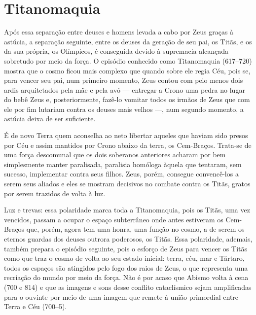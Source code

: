 \section{Titanomaquia}

Após essa separação entre deuses e homens levada a cabo por Zeus graças
à astúcia, a separação seguinte, entre os deuses da geração de seu pai,
os Titãs, e os da sua própria, os Olímpicos, é conseguida devido à
supremacia alcançada sobretudo por meio da força. O episódio conhecido
como Titanomaquia (617--720) mostra que o cosmo ficou mais complexo que
quando sobre ele regia Céu, pois se, para vencer seu pai, num primeiro
momento, Zeus contou com pelo menos dois ardis arquitetados pela mãe e
pela avó --- entregar a Crono uma pedra no lugar do bebê Zeus e,
posteriormente, fazê-lo vomitar todos os irmãos de Zeus que com ele por
fim lutariam contra os deuses mais velhos ---, num segundo momento, a
astúcia deixa de ser suficiente.

É de novo Terra quem aconselha ao neto libertar aqueles que haviam sido
presos por Céu e assim mantidos por Crono abaixo da terra, os
Cem-Braços. Trata-se de uma força descomunal que os dois soberanos
anteriores acharam por bem simplesmente manter paralisada, paralisia
homóloga àquela que tentaram, sem sucesso, implementar contra seus
filhos. Zeus, porém, consegue convencê-los a serem seus aliados e eles
se mostram decisivos no combate contra os Titãs, gratos por serem
trazidos de volta à luz.

Luz e trevas: essa polaridade marca toda a Titanomaquia, pois os Titãs,
uma vez vencidos, passam a ocupar o espaço subterrâneo onde antes
estiveram os Cem-Braços que, porém, agora tem uma honra, uma função no
cosmo, a de serem os eternos guardas dos deuses outrora poderosos, os
Titãs. Essa polaridade, ademais, também prepara o episódio seguinte,
pois o esforço de Zeus para vencer os Titãs como que traz o cosmo de
volta ao seu estado inicial: terra, céu, mar e Tártaro, todos os espaços
são atingidos pelo fogo dos raios de Zeus, o que representa uma
recriação do mundo por meio da força. Não é por acaso que Abismo volta à
cena (700 e 814) e que as imagens e sons desse conflito cataclísmico
sejam amplificadas para o ouvinte por meio de uma imagem que remete à
união primordial entre Terra e Céu (700--5).

